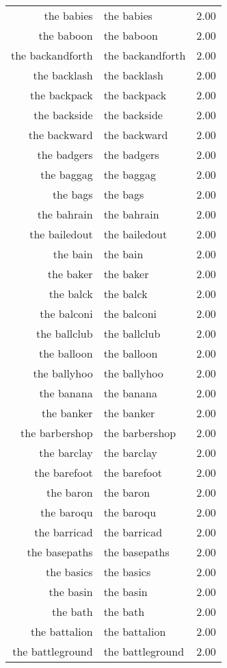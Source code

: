 \begin{table}[ht]
\begin{tabular}{rlr}
  the babies & the babies & 2.00 \\ 
  the baboon & the baboon & 2.00 \\ 
  the backandforth & the backandforth & 2.00 \\ 
  the backlash & the backlash & 2.00 \\ 
  the backpack & the backpack & 2.00 \\ 
  the backside & the backside & 2.00 \\ 
  the backward & the backward & 2.00 \\ 
  the badgers & the badgers & 2.00 \\ 
  the baggag & the baggag & 2.00 \\ 
  the bags & the bags & 2.00 \\ 
  the bahrain & the bahrain & 2.00 \\ 
  the bailedout & the bailedout & 2.00 \\ 
  the bain & the bain & 2.00 \\ 
  the baker & the baker & 2.00 \\ 
  the balck & the balck & 2.00 \\ 
  the balconi & the balconi & 2.00 \\ 
  the ballclub & the ballclub & 2.00 \\ 
  the balloon & the balloon & 2.00 \\ 
  the ballyhoo & the ballyhoo & 2.00 \\ 
  the banana & the banana & 2.00 \\ 
  the banker & the banker & 2.00 \\ 
  the barbershop & the barbershop & 2.00 \\ 
  the barclay & the barclay & 2.00 \\ 
  the barefoot & the barefoot & 2.00 \\ 
  the baron & the baron & 2.00 \\ 
  the baroqu & the baroqu & 2.00 \\ 
  the barricad & the barricad & 2.00 \\ 
  the basepaths & the basepaths & 2.00 \\ 
  the basics & the basics & 2.00 \\ 
  the basin & the basin & 2.00 \\ 
  the bath & the bath & 2.00 \\ 
  the battalion & the battalion & 2.00 \\ 
  the battleground & the battleground & 2.00 \\ 

\end{tabular}
\end{table}
